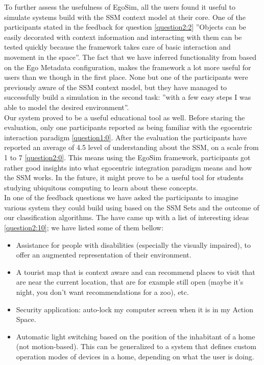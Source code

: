 To further assess the usefulness of EgoSim, all the users found it useful to simulate systems build with the SSM context model at their core. One of the participants stated in the feedback for question \ref{question2:2} ''Objects can be easily decorated with context information and interacting with them can be tested quickly because the framework takes care of basic interaction and movement in the space''. The fact that we have inferred functionality from based on the Ego Metadata configuration, makes the framework a lot more useful for users than we though in the first place. None but one of the participants were previously aware of the SSM context model, but they have managed to successfully build a simulation in the second task: ''with a few easy steps I was able to model the desired environment''.\\

Our system proved to be a useful educational tool as well. Before staring the evaluation, only one participants reported as being familiar with the egocentric interaction paradigm \ref{question1:0}. After the evaluation the participants have reported an average of 4.5 level of understanding about the SSM, on a scale from 1 to 7 \ref{question2:0}. This means using the EgoSim framework, participants got rather good insights into what egocentric integration paradigm means and how the SSM works. In the future, it might prove to be a useful tool for students studying ubiquitous computing to learn about these concepts.\\

In one of the feedback questions we have asked the participants to imagine various system they could build using based on the SSM Sets and the outcome of our classification algorithms. The have came up with a list of interesting ideas \ref{question2:10}; we have listed some of them bellow:
\begin{itemize}
	\item Assistance for people with disabilities (especially the visually impaired), to offer an augmented representation of their environment.
	\item A tourist map that is context aware and can recommend places to visit that are near the current location, that are for example still open (maybe it's night, you don't want recommendations for a zoo), etc.
	\item Security application: auto-lock my computer screen when it is in my Action Space.
	\item Automatic light switching based on the position of the inhabitant of a home (not motion-based). This can be generalized to a system that defines custom operation modes of devices in a home, depending on what the user is doing.
\end{itemize}

